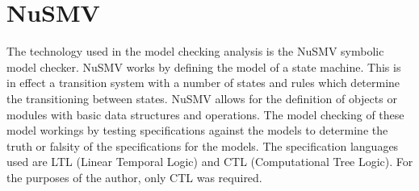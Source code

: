 \section{NuSMV}
The technology used in the model checking analysis is the NuSMV symbolic model checker. NuSMV works by defining the model of a state machine. This is in effect a transition system with a number of states and rules which determine the transitioning between states. NuSMV allows for the definition of objects or modules with basic data structures and operations. The model checking of these model workings by testing specifications against the models to determine the truth or falsity of the specifications for the models. The specification languages used are LTL (Linear Temporal Logic) and CTL (Computational Tree Logic). For the purposes of the author, only CTL was required.

